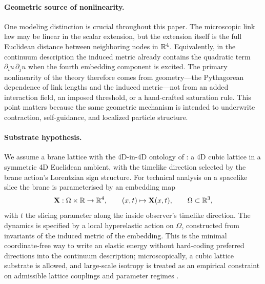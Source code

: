 \paragraph{Geometric source of nonlinearity.}
One modeling distinction is crucial throughout this paper.
The microscopic link law may be linear in the scalar extension, but the extension itself is the full Euclidean distance
between neighboring nodes in $\mathbb{R}^4$.
Equivalently, in the continuum description the induced metric already contains the quadratic term
$\partial_i u\,\partial_j u$ when the fourth embedding component is excited.
The primary nonlinearity of the theory therefore comes from geometry---the Pythagorean dependence of link lengths and the
induced metric---not from an added interaction field, an imposed threshold, or a hand-crafted saturation rule.
This point matters because the same geometric mechanism is intended to underwrite contraction, self-guidance, and
localized particle structure.

\paragraph{Substrate hypothesis.}
We assume a brane lattice with the 4D-in-4D ontology of : a 4D cubic lattice in a symmetric 4D Euclidean ambient, with the timelike direction selected by the brane action's Lorentzian sign structure.
For technical analysis on a spacelike slice the brane is parameterised by an embedding map
\begin{equation}
  \mathbf{X}:\Omega\times\mathbb{R} \to \mathbb{R}^4, \qquad (x,t)\mapsto \mathbf{X}(x,t), \qquad \Omega\subset\mathbb{R}^3,
  \label{eq:embedding-map}
\end{equation}
with $t$ the slicing parameter along the inside observer's timelike direction.
The dynamics is specified by a local hyperelastic action on $\Omega$, constructed from invariants of the
induced metric of the embedding.
This is the minimal coordinate-free way to write an elastic energy without hard-coding preferred directions into the
continuum description; microscopically, a cubic lattice substrate is allowed, and large-scale isotropy is treated as an
empirical constraint on admissible lattice couplings and parameter regimes \citep{Ogden1984,Holzapfel2000,DoCarmo1992}.


